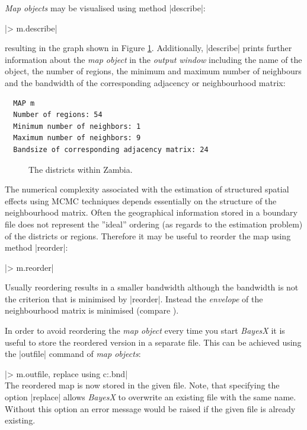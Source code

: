 \documentclass[a4paper]{article}
\begin{document}
{\it Map objects} may be visualised using method |describe|:

|> m.describe|

resulting in the graph shown in Figure \ref{zambiamap}. Additionally, |describe| prints further information about the {\it map
object} in the {\it output window} including the name of the object, the number of regions, the minimum and maximum number of
neighbours and the bandwidth of the corresponding adjacency or neighbourhood matrix:

\begin{verbatim}
  MAP m
  Number of regions: 54
  Minimum number of neighbors: 1
  Maximum number of neighbors: 9
  Bandsize of corresponding adjacency matrix: 24
\end{verbatim}

\begin{figure}[ht]
\begin{center}
 {\it\caption{The
districts within Zambia.\label{zambiamap}}}
\end{center}
\end{figure}


The numerical complexity associated with the estimation of structured spatial effects using MCMC techniques depends essentially
on the structure of the neighbourhood matrix. Often the geographical information stored in a boundary file does not represent
the ''ideal'' ordering (as regards to the estimation problem) of the districts or regions. Therefore it may be useful to
reorder the map using method |reorder|:

|> m.reorder|

Usually reordering results in a smaller bandwidth although the bandwidth is not the criterion that is minimised by |reorder|.
Instead the {\it envelope} of the neighbourhood matrix is minimised (compare ).

In order to avoid reordering the {\it map object} every time you start {\it BayesX} it is useful to store the reordered version
in a separate file. This can be achieved using the |outfile| command of {\it map objects}:

|> m.outfile, replace using c:\data\zambiasort.bnd|\\

The reordered map is now stored in the given file. Note, that specifying the option |replace| allows {\it BayesX} to overwrite
an existing file with the same name. Without this option an error message would be raised if the given file is already
existing.
\end{document}
